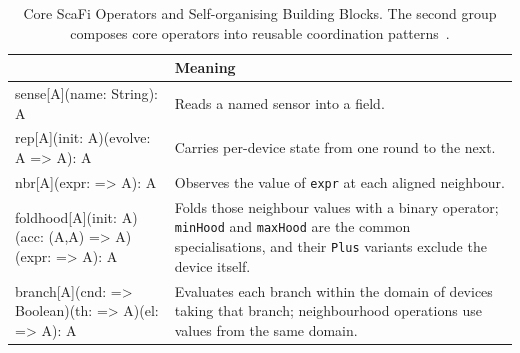 \begin{table}[!tb]
    \centering
    \small
    \renewcommand{\arraystretch}{1.15}
    \caption[Core ScaFi Operators and Self-organising Building Blocks]{Core ScaFi Operators and Self-organising Building Blocks. The second group composes core operators into reusable coordination patterns~\cite{casadei2022scafi,DBLP:conf/saso/BealV14a}.}
    \label{tab:scafi-operators}
    \newcommand{\scFn}[1]{\textcolor{vscLightFunction}{#1}}
    \newcommand{\scTy}[1]{\textcolor{vscLightType}{#1}}
    \begin{tabularx}{\textwidth}{@{}>{\ttfamily\scriptsize}p{} >{\raggedright\arraybackslash}X@{}}
        \toprule
        \multicolumn{1}{@{}l}{\textbf{Signature}} & \textbf{Meaning} \\
        \midrule
        \scFn{sense}[\scTy{A}](name: \scTy{String}): \scTy{A}
            & Reads a named sensor into a field. \\
        \scFn{rep}[\scTy{A}](init: \scTy{A})(evolve: \scTy{A} => \scTy{A}): \scTy{A}
            & Carries per-device state from one round to the next. \\
        \scFn{nbr}[\scTy{A}](expr: => \scTy{A}): \scTy{A}
            & Observes the value of \texttt{expr} at each aligned neighbour. \\
        \scFn{foldhood}[\scTy{A}](init: \scTy{A})(acc: (\scTy{A},\scTy{A}) => \scTy{A})\newline\hspace*{1em}(expr: => \scTy{A}): \scTy{A}
            & Folds those neighbour values with a binary operator; \texttt{minHood} and \texttt{maxHood} are the common specialisations, and their \texttt{Plus} variants exclude the device itself. \\
        \scFn{branch}[\scTy{A}](cnd: => \scTy{Boolean})\newline\hspace*{1em}(th: => \scTy{A})(el: => \scTy{A}): \scTy{A}
            & Evaluates each branch within the domain of devices taking that branch; neighbourhood operations use values from the same domain. \\

\end{tabularx}
\end{table}

